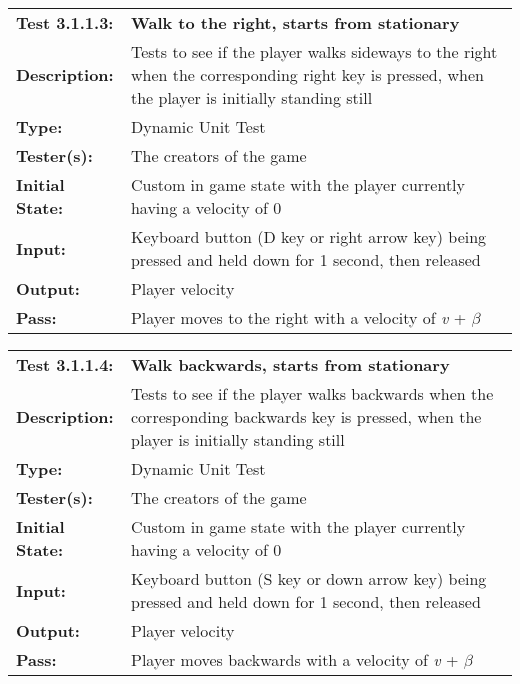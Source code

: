 \documentclass[12pt, titlepage]{article}
\begin{document}
\begin{enumerate}
\begin{mdframed}[linewidth=1pt]
\begin{tabularx}{\textwidth}{@{}p{3cm}X@{}}
{\bf Test 3.1.1.3:} & {\bf Walk to the right, starts from stationary}\\[\baselineskip]
{\bf Description:} & Tests to see if the player walks sideways to the right when the corresponding right key is pressed, when the player is initially standing still\\[0.5\baselineskip]
{\bf Type:} & Dynamic Unit Test\\[0.5\baselineskip]
{\bf Tester(s):} & The creators of the game\\[0.5\baselineskip]
{\bf Initial State:} & Custom in game state with the player currently having a velocity of 0\\[0.5\baselineskip]
{\bf Input:} & Keyboard button (D key or right arrow key) being pressed and held down for 1 second, then released\\[0.5\baselineskip]
{\bf Output:} & Player velocity\\[0.5\baselineskip]
{\bf Pass:} & Player moves to the right with a velocity of \textit{v} + $\beta$
\end{tabularx}
\end{mdframed}

\begin{mdframed}[linewidth=1pt]
\begin{tabularx}{\textwidth}{@{}p{3cm}X@{}}
{\bf Test 3.1.1.4:} & {\bf Walk backwards, starts from stationary}\\[\baselineskip]
{\bf Description:} & Tests to see if the player walks backwards when the corresponding backwards key is pressed, when the player is initially standing still\\[0.5\baselineskip]
{\bf Type:} & Dynamic Unit Test\\[0.5\baselineskip]
{\bf Tester(s):} & The creators of the game\\[0.5\baselineskip]
{\bf Initial State:} & Custom in game state with the player currently having a velocity of 0\\[0.5\baselineskip]
{\bf Input:} & Keyboard button (S key or down arrow key) being pressed and held down for 1 second, then released\\[0.5\baselineskip]
{\bf Output:} & Player velocity\\[0.5\baselineskip]
{\bf Pass:} & Player moves backwards with a velocity of \textit{v} + $\beta$
\end{tabularx}
\end{mdframed}


\end{enumerate}
\end{document}
